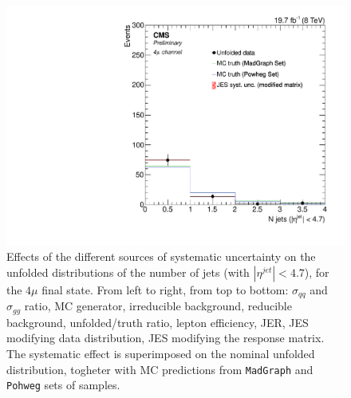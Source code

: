 \begin{figure}[hbtp]
\begin{center}
    \includegraphics[width=0.8\cmsFigWidth]{Figures/Unfolding/Systematics/ZZTo4m_Jets_JES_ModMat_Mad_fr}
        \caption{Effects of the different sources of systematic uncertainty on the unfolded distributions of the number of jets (with $|\eta^{jet}|<4.7$), for the     
    $4\mu$ final state. From left to right, from top to bottom: $\sigma_{qq}$ and $\sigma_{gg}$ ratio, MC generator, irreducible background,
reducible background, unfolded/truth ratio, lepton efficiency, JER, JES modifying data distribution, JES modifying the response matrix. The systematic effect is superimposed on the nominal unfolded distribution, togheter with MC predictions from \texttt{MadGraph} and \texttt{Pohweg} sets of samples.}
    \label{fig:Jets_syst_4m}
  \end{center}
\end{figure}

